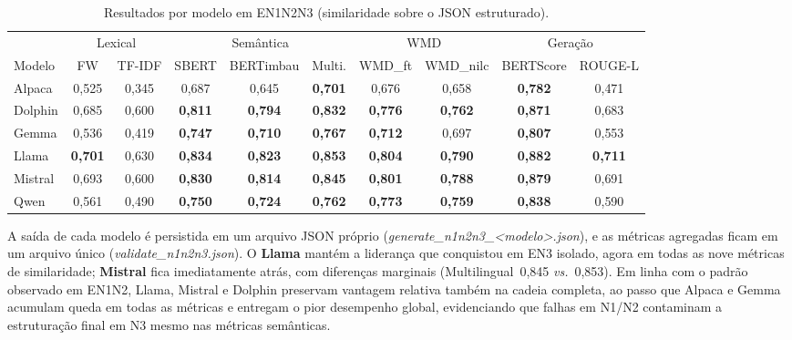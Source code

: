 \documentclass[a4paper,fleqn]{cas-sc}
\newcommand{\melhor}[1]{\textcolor{green!55!black}{#1}}
\newcommand{\pior}[1]{\textcolor{red!80!black}{#1}}
\begin{document}
\begin{table}[ht]
\centering
\caption{Resultados por modelo em EN1N2N3 (similaridade sobre o JSON estruturado).}
\label{tab:resultados_en1n2n3}
\scriptsize
\begin{tabular}{lccccccccc}
\hline
 & \multicolumn{2}{c}{Lexical} & \multicolumn{3}{c}{Semântica} & \multicolumn{2}{c}{WMD} & \multicolumn{2}{c}{Geração} \\
\cline{2-3}\cline{4-6}\cline{7-8}\cline{9-10}
Modelo & FW & TF-IDF & SBERT & BERTimbau & Multi. & WMD\_ft & WMD\_nilc & BERTScore & ROUGE-L \\
\hline
Alpaca  & \pior{0{,}525} & \pior{0{,}345} & \pior{0{,}687} & \pior{0{,}645} & \pior{\textbf{0{,}701}} & \pior{0{,}676} & \pior{0{,}658} & \pior{\textbf{0{,}782}} & \pior{0{,}471} \\
Dolphin & 0{,}685 & 0{,}600 & \textbf{0{,}811} & \textbf{0{,}794} & \textbf{0{,}832} & \textbf{0{,}776} & \textbf{0{,}762} & \textbf{0{,}871} & 0{,}683 \\
Gemma   & 0{,}536 & 0{,}419 & \textbf{0{,}747} & \textbf{0{,}710} & \textbf{0{,}767} & \textbf{0{,}712} & 0{,}697 & \textbf{0{,}807} & 0{,}553 \\
Llama   & \melhor{\textbf{0{,}701}} & \melhor{0{,}630} & \melhor{\textbf{0{,}834}} & \melhor{\textbf{0{,}823}} & \melhor{\textbf{0{,}853}} & \melhor{\textbf{0{,}804}} & \melhor{\textbf{0{,}790}} & \melhor{\textbf{0{,}882}} & \melhor{\textbf{0{,}711}} \\
Mistral & 0{,}693 & 0{,}600 & \textbf{0{,}830} & \textbf{0{,}814} & \textbf{0{,}845} & \textbf{0{,}801} & \textbf{0{,}788} & \textbf{0{,}879} & 0{,}691 \\
Qwen    & 0{,}561 & 0{,}490 & \textbf{0{,}750} & \textbf{0{,}724} & \textbf{0{,}762} & \textbf{0{,}773} & \textbf{0{,}759} & \textbf{0{,}838} & 0{,}590 \\
\hline
\end{tabular}
\end{table}

A saída de cada modelo é persistida em um arquivo JSON próprio (\textit{generate\_n1n2n3\_<modelo>.json}), e as métricas agregadas ficam em um arquivo único (\textit{validate\_n1n2n3.json}). O \textbf{Llama} mantém a liderança que conquistou em EN3 isolado, agora em todas as nove métricas de similaridade; \textbf{Mistral} fica imediatamente atrás, com diferenças marginais (Multilingual~0{,}845 \textit{vs.}~0{,}853). Em linha com o padrão observado em EN1N2, Llama, Mistral e Dolphin preservam vantagem relativa também na cadeia completa, ao passo que Alpaca e Gemma acumulam queda em todas as métricas e entregam o pior desempenho global, evidenciando que falhas em N1/N2 contaminam a estruturação final em N3 mesmo nas métricas semânticas.
\end{document}
